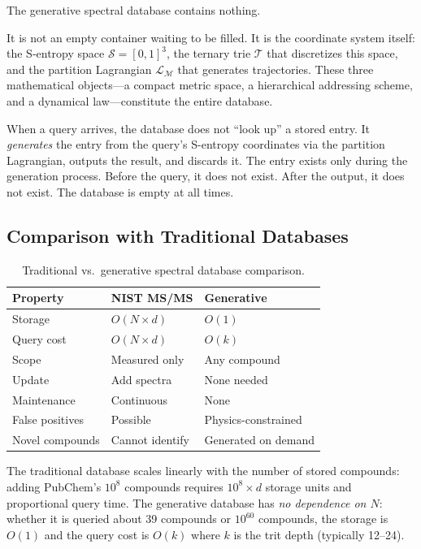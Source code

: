 \documentclass[11pt,twocolumn,a4paper]{article}
\theoremstyle{definition}
\theoremstyle{remark}
\newcommand{\Sspace}{\mathcal{S}}
\newcommand{\Depth}{\mathcal{M}}
\newcommand{\Trie}{\mathcal{T}}
\newcommand{\Lagr}{\mathcal{L}}
\begin{document}
The generative spectral database contains nothing.

It is not an empty container waiting to be filled. It is the coordinate system itself: the S-entropy space $\Sspace = [0,1]^3$, the ternary trie $\Trie$ that discretizes this space, and the partition Lagrangian $\Lagr_\Depth$ that generates trajectories. These three mathematical objects---a compact metric space, a hierarchical addressing scheme, and a dynamical law---constitute the entire database.

When a query arrives, the database does not ``look up'' a stored entry. It \emph{generates} the entry from the query's S-entropy coordinates via the partition Lagrangian, outputs the result, and discards it. The entry exists only during the generation process. Before the query, it does not exist. After the output, it does not exist. The database is empty at all times.

\subsection{Comparison with Traditional Databases}
\label{sec:comparison}

\begin{table}[H]
\centering
\caption{Traditional vs.\ generative spectral database comparison.}
\label{tab:comparison}
\begin{tabular}{@{}lll@{}}
\toprule
\textbf{Property} & \textbf{NIST MS/MS} & \textbf{Generative} \\
\midrule
Storage & $O(N \times d)$ & $O(1)$ \\
Query cost & $O(N \times d)$ & $O(k)$ \\
Scope & Measured only & Any compound \\
Update & Add spectra & None needed \\
Maintenance & Continuous & None \\
False positives & Possible & Physics-constrained \\
Novel compounds & Cannot identify & Generated on demand \\
\bottomrule
\end{tabular}
\end{table}

The traditional database scales linearly with the number of stored compounds: adding PubChem's $10^8$ compounds requires $10^8 \times d$ storage units and proportional query time. The generative database has \emph{no dependence on $N$}: whether it is queried about 39 compounds or $10^{60}$ compounds, the storage is $O(1)$ and the query cost is $O(k)$ where $k$ is the trit depth (typically 12--24).
\end{document}
